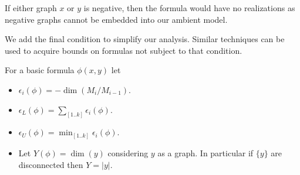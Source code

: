 \documentclass{amsart}
\newcommand{\paren}[1]{\left(#1\right)}
\begin{document}



\begin{Note}
	If either graph $x$ or $y$ is negative, then the formula would have no realizations as negative graphs cannot be embedded into our ambient model.
\end{Note}

\begin{Note} \label{note_special}
	We add the final condition to simplify our analysis. Similar techniques can be used to acquire bounds on formulas not subject to that condition.
\end{Note}

\begin{Definition}
	For a basic formula $\phi(x, y)$ let
	\begin{itemize}
		\item $\epsilon_i(\phi) = -\dim \paren{M_i/M_{i-1}}$.
		\item $\epsilon_L(\phi) = \sum_{[1..k]} \epsilon_i(\phi)$.
		\item $\epsilon_U(\phi) = \min_{[1..k]} \epsilon_i(\phi)$.
		\item Let $Y(\phi) = \dim (y)$ considering $y$ as a graph.
		In particular if $\{y\}$ are disconnected then $Y = |y|$.
	\end{itemize}
\end{Definition}

\end{document}
